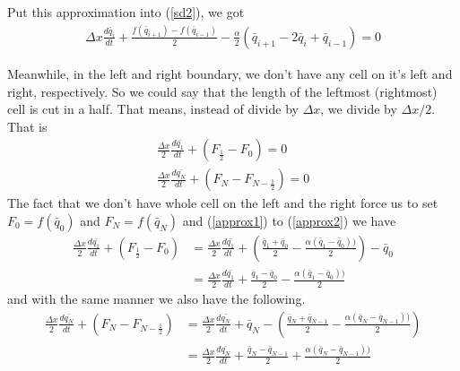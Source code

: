 \documentclass{article}
\theoremstyle{definition}
\begin{document}
    Put this approximation into (\ref{sd2}), we got 
    \begin{align}\label{fluxmid1}
        \Delta x \frac{d\bar{{q}}_i}{dt} + \frac{f(\bar{{q}}_{i+1}) -f(\bar{{q}}_{i-1}) }{2} 
        - \frac{\alpha}2 {\left(\bar{{q}}_{i+1} - 2\bar{{q}}_i + \bar{{q}}_{i-1}\right)} = 0
    \end{align}

    \newpage
    Meanwhile, in the left and right boundary, 
    we don't have any cell on it's left and right, respectively. 
    So we could say that the length of the leftmost (rightmost) cell 
    is cut in a half. That means, instead of divide by $\Delta x$, 
    we divide by $\Delta x/2$. That is 
    \begin{align}
        \label{approx2}\frac{\Delta x}2 \frac{d\bar{q_1}}{dt} 
                            + \left( F_{\frac12} -F_{0}  \right) = 0 \\
        \label{approx3}\frac{\Delta x}2  \frac{d\bar{q_N}}{dt} 
                            + \left( F_{N} - F_{N-\frac12}  \right) = 0 
    \end{align}
    The fact that we don't have whole cell on the left and the right force us to 
    set $F_0 = f(\bar{q}_0)$ and $F_N = f(\bar{q}_N)$
    and (\ref{approx1}) to (\ref{approx2})  we have
    \begin{align}
        \frac{\Delta x}2 \frac{d\bar{q_1}}{dt} + \left( F_{\frac12} -F_{0}  \right) 
                &= \frac{\Delta x}2 \frac{d\bar{q_1}}{dt} 
                + \left(\frac{\bar{q}_{1} +\bar{q}_{0}}{2} 
                - \frac{\alpha (\bar{q}_{1}-\bar{q}_{0}))}{2} \right) - \bar{q}_0 \\
                &=\frac{\Delta x}2 \frac{d\bar{q_1}}{dt} 
                + \frac{\bar{q}_{1} -\bar{q}_{0}}{2} 
                - \frac{\alpha (\bar{q}_{1}-\bar{q}_{0}))}{2}  
    \end{align}
    and with the same manner we also have the following. 
    \begin{align}
        \frac{\Delta x}2 \frac{d\bar{q_N}}{dt} + \left( F_{N} -F_{N-\frac12}  \right) 
        &= \frac{\Delta x}2 \frac{d\bar{q_N}}{dt} +\bar{q}_N 
        - \left(\frac{\bar{q}_{N} +\bar{q}_{N-1}}{2} 
        - \frac{\alpha (\bar{q}_{N}-\bar{q}_{N-1}))}{2} \right)\\
        &= \frac{\Delta x}2 \frac{d\bar{q_N}}{dt} 
        + \frac{\bar{q}_{N} - \bar{q}_{N-1}}{2} 
        + \frac{\alpha (\bar{q}_{N}-\bar{q}_{N-1}))}{2} 
    \end{align}
\end{document}

